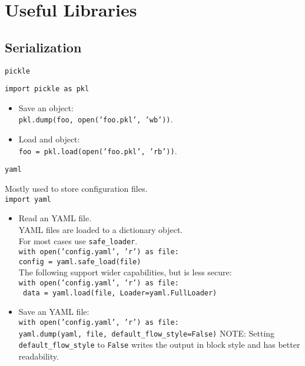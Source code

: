 \section{Useful Libraries}

\subsection{Serialization}

\begin{center}
    \large{\texttt{pickle}}\\
\end{center}
 
\texttt{import pickle as pkl}
\begin{itemize}
\item Save an object:\\
        \texttt{pkl.dump(foo, open('foo.pkl', 'wb'))}.
\item Load and object:\\
        \texttt{foo = pkl.load(open('foo.pkl', 'rb'))}.
\end{itemize}


\begin{center}
    \large{\texttt{yaml}}\\
\end{center}

Mostly used to store configuration files.\\

\texttt{import yaml}

\begin{itemize}
\item Read an YAML file.\\ 
        YAML files are loaded to a dictionary object.\\
        For most cases use \texttt{safe\_loader}.\\
        \texttt{with open('config.yaml', 'r') as file:}\\
        \hspace{8pt}\texttt{config = yaml.safe\_load(file)}\\
        The following support wider capabilities, but is less secure:\\
        \texttt{with open('config.yaml', 'r') as file:}\\
        \hspace{8pt}\texttt{ data = yaml.load(file, Loader=yaml.FullLoader)}\\

\item Save an YAML file:\\
        \texttt{with open('config.yaml', 'r') as file:}\\
        \hspace{8pt}\texttt{yaml.dump(yaml, file, default\_flow\_style=False)}
        NOTE: Setting \texttt{default\_flow\_style} to \texttt{False} writes the output in block style and has better readability.\\
\end{itemize}

